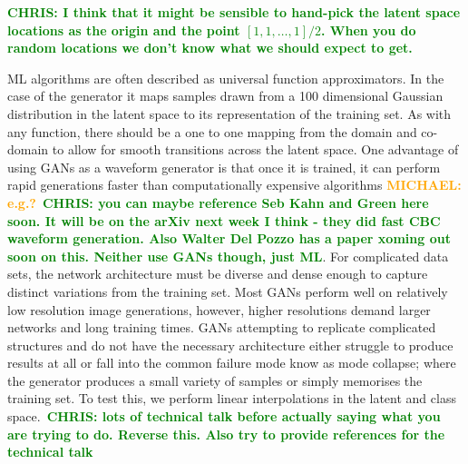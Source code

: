 \documentclass[12pt]{iopart}
\newcommand{\chris}[1]{\textbf{\textcolor{green}{CHRIS: #1}}}
\newcommand{\michael}[1]{\textbf{\textcolor{orange}{MICHAEL: #1}}}
\begin{document}
\chris{I think that it might be sensible to hand-pick the latent space
locations as the origin and the point $[1,1,\ldots,1]/2$. When you do random
locations we don't know what we should expect to get.}

\ac{ML} algorithms are often described as universal function approximators. In
the case of the generator it maps samples drawn from a 100 dimensional Gaussian
distribution in the latent space to its representation of the training set. As
with any function, there should be a one to one mapping from the domain and
co-domain to allow for smooth transitions across the latent space. One
advantage of using \acp{GAN} as a waveform generator is that once it is
trained, it can perform rapid generations faster than computationally expensive
algorithms \michael{e.g.?}~\chris{you can maybe reference Seb Kahn and Green
here soon. It will be on the arXiv next week I think - they did fast CBC
waveform generation.  Also Walter Del Pozzo has a paper xoming out soon on
this. Neither use GANs though, just ML}. For complicated data sets, the network
architecture must be diverse and dense enough to capture distinct variations
from the training set.  Most GANs perform well on relatively low resolution
image generations, however, higher resolutions demand larger networks and long
training times. GANs attempting to replicate complicated structures and do not
have the necessary architecture either struggle to produce results at all or
fall into the common failure mode know as mode collapse; where the generator
produces a small variety of samples or simply memorises the training set. To
test this, we perform linear interpolations in the latent and class
space.~\chris{lots of technical talk before actually saying what you are trying
to do. Reverse this. Also try to provide references for the technical talk} 
\end{document}
